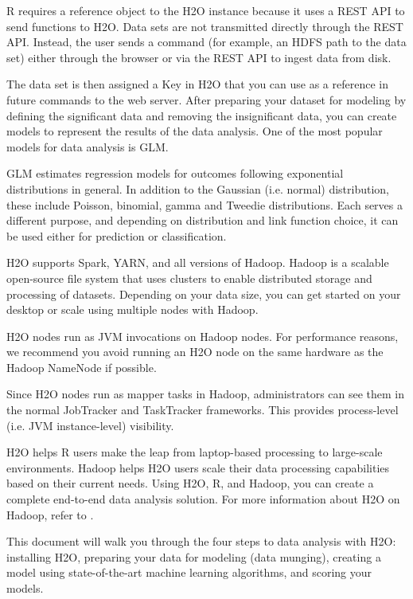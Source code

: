\documentclass[11pt]{article}
\begin{document}
R requires a reference object to the H2O instance because it uses a REST API to send functions to H2O. Data sets are not transmitted directly through the REST API. Instead, the user sends a command (for example, an HDFS path to the data set) either through the browser or via the REST API to ingest data from disk.

The data set is then assigned a Key in H2O that you can use as a reference in future commands to the web server. After preparing your dataset for modeling by defining the significant data and removing the insignificant data, you can create models to represent the results of the data analysis. One of the most popular models for data analysis is GLM. 

GLM estimates regression models for outcomes following exponential distributions in general. In addition to the Gaussian (i.e. normal) distribution, these include Poisson, binomial, gamma and Tweedie distributions. Each serves a different purpose, and depending on distribution and link function choice, it can be used either for prediction or classification.

H2O supports Spark, YARN, and all versions of Hadoop. Hadoop is a scalable open-source file system that uses clusters to enable distributed storage and processing of datasets. Depending on your data size, you can get started on your desktop or scale using multiple nodes with Hadoop. 

H2O nodes run as JVM invocations on Hadoop nodes. For performance reasons, we recommend you avoid running an H2O node on the same hardware as the Hadoop NameNode if possible.

Since H2O nodes run as mapper tasks in Hadoop, administrators can see them in the normal JobTracker and TaskTracker frameworks. This provides process-level (i.e. JVM instance-level) visibility.

H2O helps R users make the leap from laptop-based processing to large-scale environments. Hadoop helps H2O users scale their data processing capabilities based on their current needs. Using H2O, R, and Hadoop, you can create a complete end-to-end data analysis solution. For more information about H2O on Hadoop, refer to .

This document will walk you through the four steps to data analysis with H2O: installing H2O, preparing your data for modeling (data munging), creating a model using state-of-the-art machine learning algorithms, and scoring your models. 
\end{document}
